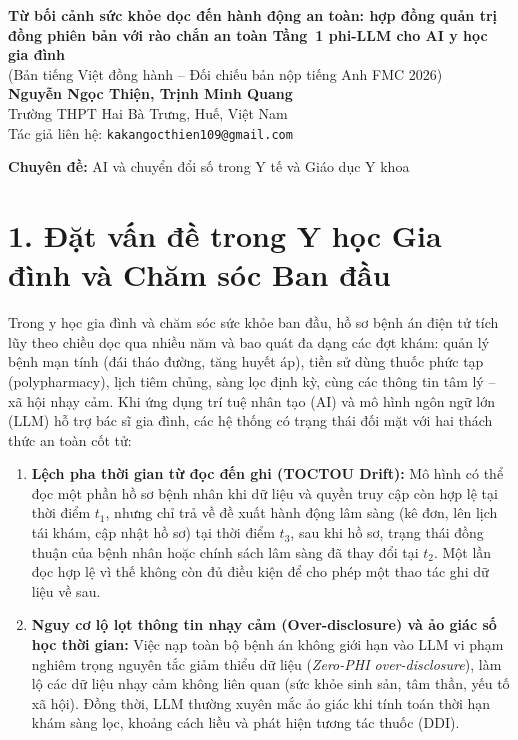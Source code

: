 \documentclass[11pt]{article}
\begin{document}
\begin{center}
{\Large\bfseries Từ bối cảnh sức khỏe dọc đến hành động an toàn: hợp đồng quản trị đồng phiên bản với rào chắn an toàn Tầng~1 phi-LLM cho AI y học gia đình}\\[0.3em]
\large (Bản tiếng Việt đồng hành -- Đối chiếu bản nộp tiếng Anh FMC 2026)\\[0.7em]
\textbf{Nguyễn Ngọc Thiện, Trịnh Minh Quang}\\
Trường THPT Hai Bà Trưng, Huế, Việt Nam\\
Tác giả liên hệ: \texttt{kakangocthien109@gmail.com}
\end{center}
\textbf{Chuyên đề:} AI và chuyển đổi số trong Y tế và Giáo dục Y khoa

\section*{1. Đặt vấn đề trong Y học Gia đình và Chăm sóc Ban đầu}
Trong y học gia đình và chăm sóc sức khỏe ban đầu, hồ sơ bệnh án điện tử tích lũy theo chiều dọc qua nhiều năm và bao quát đa dạng các đợt khám: quản lý bệnh mạn tính (đái tháo đường, tăng huyết áp), tiền sử dùng thuốc phức tạp (polypharmacy), lịch tiêm chủng, sàng lọc định kỳ, cùng các thông tin tâm lý -- xã hội nhạy cảm. Khi ứng dụng trí tuệ nhân tạo (AI) và mô hình ngôn ngữ lớn (LLM) hỗ trợ bác sĩ gia đình, các hệ thống có trạng thái đối mặt với hai thách thức an toàn cốt tử:

\begin{enumerate}[leftmargin=1.8em]
\item \textbf{Lệch pha thời gian từ đọc đến ghi (TOCTOU Drift):} Mô hình có thể đọc một phần hồ sơ bệnh nhân khi dữ liệu và quyền truy cập còn hợp lệ tại thời điểm $t_1$, nhưng chỉ trả về đề xuất hành động lâm sàng (kê đơn, lên lịch tái khám, cập nhật hồ sơ) tại thời điểm $t_3$, sau khi hồ sơ, trạng thái đồng thuận của bệnh nhân hoặc chính sách lâm sàng đã thay đổi tại $t_2$. Một lần đọc hợp lệ vì thế không còn đủ điều kiện để cho phép một thao tác ghi dữ liệu về sau.
\item \textbf{Nguy cơ lộ lọt thông tin nhạy cảm (Over-disclosure) và ảo giác số học thời gian:} Việc nạp toàn bộ bệnh án không giới hạn vào LLM vi phạm nghiêm trọng nguyên tắc giảm thiểu dữ liệu (\emph{Zero-PHI over-disclosure}), làm lộ các dữ liệu nhạy cảm không liên quan (sức khỏe sinh sản, tâm thần, yếu tố xã hội). Đồng thời, LLM thường xuyên mắc ảo giác khi tính toán thời hạn khám sàng lọc, khoảng cách liều và phát hiện tương tác thuốc (DDI).
\end{enumerate}
\end{document}
